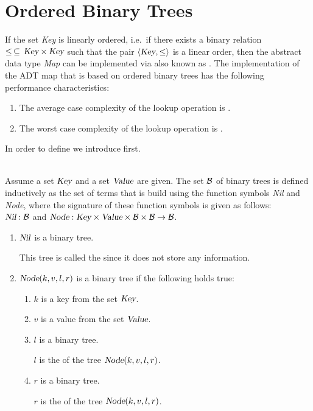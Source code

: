 \section{Ordered Binary Trees}
If the set \textsl{Key} is linearly ordered, i.e.~if there exists a binary relation
$\leq \,\subseteq\,\textsl{Key}\times\textsl{Key}$ such that the pair $\langle \textsl{Key}, \leq \rangle$ is a linear
order, then the abstract data type \textsl{Map} can be implemented via  
\href{https://en.wikipedia.org/wiki/Binary_search_tree}{} also known as
. 
The implementation of the ADT map that is based on ordered binary trees has the following performance
characteristics: 
\begin{enumerate}
\item The average case complexity of the lookup operation is .
\item The worst case complexity of the lookup operation is .  
\end{enumerate}
In order to define  we introduce
 first.

\begin{Definition} \hspace*{\fill} \\
  Assume a set $\textsl{Key}$ and a set $\textsl{Value}$ are given.
  The set $\mathcal{B}$ of binary trees is defined inductively as the set of terms that is build using the
  function symbols \textsl{Nil} and \textsl{Node}, where the signature of these function symbols is
  given as follows: \\[0.2cm]
  \hspace*{1.3cm} 
  $\textsl{Nil}: \mathcal{B}$ \qquad and \qquad  $\textsl{Node}: \textsl{Key} \times \textsl{Value} \times \mathcal{B} \times \mathcal{B} \rightarrow \mathcal{B}$.
  \begin{enumerate}
  \item $\textsl{Nil}$ is a binary tree.

        This tree is called the  since it does not store any information.
  \item $\textsl{Node}(k, v, l, r)$ is a binary tree if the following holds true: 
        \begin{enumerate}
        \item $k$ is a key from the set $\textsl{Key}$.
        \item $v$ is a value from the set $\textsl{Value}$.
        \item $l$ is a binary tree.

              $l$ is the   of the tree $\textsl{Node}(k, v, l, r)$.
        \item $r$ is a binary tree.

              $r$ is the  of the tree $\textsl{Node}(k, v, l, r)$.
              \eox
        \end{enumerate}
  \end{enumerate}
\end{Definition}

